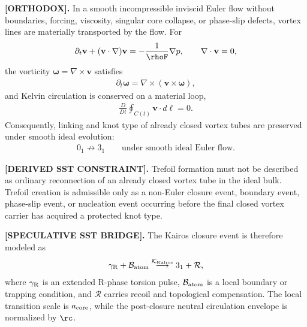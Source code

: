     \textbf{[ORTHODOX].}
    In a smooth incompressible inviscid Euler flow without boundaries, forcing,
    viscosity, singular core collapse, or phase-slip defects, vortex lines are
    materially transported by the flow. For
    \begin{align}
        \partial_t\mathbf{v}
        +
        (\mathbf{v}\cdot\nabla)\mathbf{v}
        =
        -\frac{1}{\rhoF}\nabla p,
        \qquad
        \nabla\cdot\mathbf{v}=0,
    \end{align}
    the vorticity \(\boldsymbol{\omega}=\nabla\times\mathbf{v}\) satisfies
    \begin{align}
        \partial_t\boldsymbol{\omega}
        =
        \nabla\times(\mathbf{v}\times\boldsymbol{\omega}),
        \label{eq:euler_vorticity_frozen_in}
    \end{align}
    and Kelvin circulation is conserved on a material loop,
    \begin{align}
        \frac{D}{Dt}\oint_{C(t)}\mathbf{v}\cdot d\boldsymbol{\ell}=0 .
        \label{eq:kelvin_preservation_closure_section}
    \end{align}
    Consequently, linking and knot type of already closed vortex tubes are
    preserved under smooth ideal evolution:
    \begin{align}
        0_1 \not\to 3_1
        \qquad
        \text{under smooth ideal Euler flow.}
        \label{eq:unknot_not_to_trefoil_euler}
    \end{align}

    \textbf{[DERIVED SST CONSTRAINT].}
    Trefoil formation must not be described as ordinary reconnection of an
    already closed vortex tube in the ideal bulk. Trefoil creation is admissible
    only as a non-Euler closure event, boundary event, phase-slip event, or
    nucleation event occurring before the final closed vortex carrier has
    acquired a protected knot type.

    \textbf{[SPECULATIVE SST BRIDGE].}
    The Kairos closure event is therefore modeled as
    \begin{align}
        \gamma_{\rm R}
        +
        \mathcal{B}_{\rm atom}
        \overset{\mathcal{K}_{\rm Kairos}}{\longrightarrow}
        3_1
        +
        \mathcal{R},
        \label{eq:kairos_closure_event}
    \end{align}
    where \(\gamma_{\rm R}\) is an extended R-phase torsion pulse,
    \(\mathcal{B}_{\rm atom}\) is a local boundary or trapping condition, and
    \(\mathcal{R}\) carries recoil and topological compensation. The local
    transition scale is \(a_{\rm core}\), while the post-closure neutral
    circulation envelope is normalized by \(\rc\).
